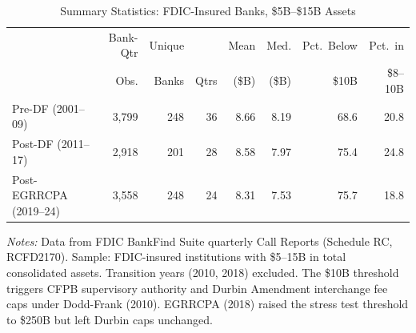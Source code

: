 \begin{table}[htbp]
\centering
\begin{threeparttable}
\caption{Summary Statistics: FDIC-Insured Banks, \$5B--\$15B Assets}
\label{tab:summary}
\small
\begin{tabular}{lrrrrrrr}
\toprule
 & Bank-Qtr & Unique & & Mean & Med. & Pct.\ Below & Pct.\ in \\
 & Obs. & Banks & Qtrs & (\$B) & (\$B) & \$10B & \$8--10B \\
\midrule
Pre-DF (2001--09) & 3,799 & 248 & 36 & 8.66 & 8.19 & 68.6 & 20.8 \\
Post-DF (2011--17) & 2,918 & 201 & 28 & 8.58 & 7.97 & 75.4 & 24.8 \\
Post-EGRRCPA (2019--24) & 3,558 & 248 & 24 & 8.31 & 7.53 & 75.7 & 18.8 \\
\bottomrule
\end{tabular}
\begin{tablenotes}[flushleft]
\small
\item \textit{Notes:} Data from FDIC BankFind Suite quarterly Call Reports (Schedule RC, RCFD2170). Sample: FDIC-insured institutions with \$5--15B in total consolidated assets. Transition years (2010, 2018) excluded. The \$10B threshold triggers CFPB supervisory authority and Durbin Amendment interchange fee caps under Dodd-Frank (2010). EGRRCPA (2018) raised the stress test threshold to \$250B but left Durbin caps unchanged.
\end{tablenotes}
\end{threeparttable}
\end{table}
